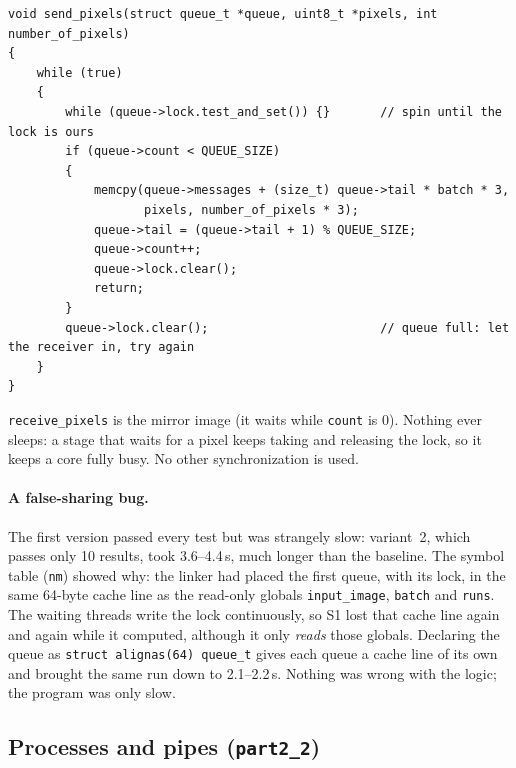 \documentclass[11pt,a4paper]{article}
\begin{document}
\begin{lstlisting}
void send_pixels(struct queue_t *queue, uint8_t *pixels, int number_of_pixels)
{
    while (true)
    {
        while (queue->lock.test_and_set()) {}       // spin until the lock is ours
        if (queue->count < QUEUE_SIZE)
        {
            memcpy(queue->messages + (size_t) queue->tail * batch * 3,
                   pixels, number_of_pixels * 3);
            queue->tail = (queue->tail + 1) % QUEUE_SIZE;
            queue->count++;
            queue->lock.clear();
            return;
        }
        queue->lock.clear();                        // queue full: let the receiver in, try again
    }
}
\end{lstlisting}

\noindent \texttt{receive\_pixels} is the mirror image (it waits while \texttt{count} is 0). Nothing
ever sleeps: a stage that waits for a pixel keeps taking and releasing the lock, so it keeps a core
fully busy. No other synchronization is used.

\paragraph{A false-sharing bug.} The first version passed every test but was strangely slow:
variant~2, which passes only 10 results, took 3.6--4.4\,s, much longer than the baseline. The symbol
table (\texttt{nm}) showed why: the linker had placed the first queue, with its lock, in the same
64-byte cache line as the read-only globals \texttt{input\_image}, \texttt{batch} and \texttt{runs}.
The waiting threads write the lock continuously, so S1 lost that cache line again and again while
it computed, although it only \emph{reads} those globals. Declaring the queue as
\texttt{struct alignas(64) queue\_t} gives each queue a cache line of its own and brought the same
run down to 2.1--2.2\,s. Nothing was wrong with the logic; the program was only slow.

\subsection{Processes and pipes (\texttt{part2\_2})}
\end{document}
